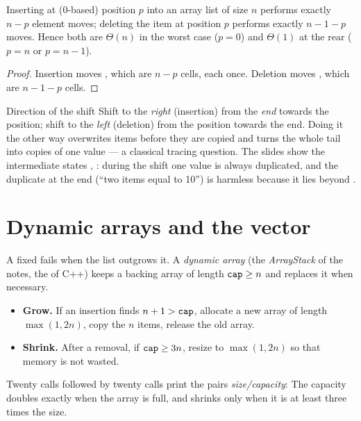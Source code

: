 \begin{theorem}\label{thm:shift}
Inserting at (0-based) position $p$ into an array list of size $n$ performs exactly $n-p$
element moves; deleting the item at position $p$ performs exactly $n-1-p$ moves. Hence
both are $\Theta(n)$ in the worst case ($p=0$) and $\Theta(1)$ at the rear ($p=n$ or
$p=n-1$).
\end{theorem}
\begin{proof}
Insertion moves , which are $n-p$ cells, each once. Deletion moves
, which are $n-1-p$ cells.
\end{proof}

\begin{note}{Direction of the shift}
Shift to the \emph{right} (insertion) from the \emph{end} towards the position; shift to
the \emph{left} (deletion) from the position towards the end. Doing it the other way
overwrites items before they are copied and turns the whole tail into copies of one value
--- a classical tracing question. The slides show the intermediate states
, : during the shift one value is always duplicated,
and the duplicate at the end (``two items equal to 10'') is harmless because it lies
beyond .
\end{note}

\section{Dynamic arrays and the vector}\label{sec:vector}

A fixed  fails when the list outgrows it. A \emph{dynamic array} (the
\emph{ArrayStack} of the notes, the  of C++) keeps a backing array of
length $\texttt{cap}\ge n$ and replaces it when necessary.
\begin{itemize}
\item \textbf{Grow.} If an insertion finds $n+1>\texttt{cap}$, allocate a new array of length
  $\max(1,2n)$, copy the $n$ items, release the old array.
\item \textbf{Shrink.} After a removal, if $\texttt{cap}\ge3n$, resize to $\max(1,2n)$ so
  that memory is not wasted.
\end{itemize}


Twenty  calls followed by twenty  calls print the pairs
\emph{size/capacity}:
The capacity doubles exactly when the array is full, and shrinks only when it is at
least three times the size.

